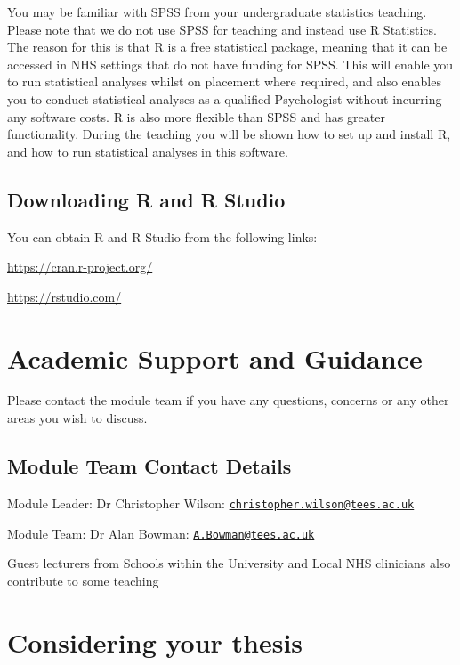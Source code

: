 \documentclass[
]{book}
\begin{document}
You may be familiar with SPSS from your undergraduate statistics teaching. Please note that we do not use SPSS for teaching and instead use R Statistics. The reason for this is that R is a free statistical package, meaning that it can be accessed in NHS settings that do not have funding for SPSS. This will enable you to run statistical analyses whilst on placement where required, and also enables you to conduct statistical analyses as a qualified Psychologist without incurring any software costs. R is also more flexible than SPSS and has greater functionality. During the teaching you will be shown how to set up and install R, and how to run statistical analyses in this software.

\hypertarget{downloading-r-and-r-studio}{%
\subsection{Downloading R and R Studio}\label{downloading-r-and-r-studio}}

You can obtain R and R Studio from the following links:

\url{https://cran.r-project.org/}

\url{https://rstudio.com/}

\hypertarget{academic-support-and-guidance}{%
\section{Academic Support and Guidance}\label{academic-support-and-guidance}}

Please contact the module team if you have any questions, concerns or any other areas you wish to discuss.

\hypertarget{module-team-contact-details}{%
\subsection{Module Team Contact Details}\label{module-team-contact-details}}

Module Leader: Dr Christopher Wilson: \href{mailto:christopher.wilson@tees.ac.uk}{\nolinkurl{christopher.wilson@tees.ac.uk}}

Module Team: Dr Alan Bowman: \href{mailto:A.Bowman@tees.ac.uk}{\nolinkurl{A.Bowman@tees.ac.uk}}

Guest lecturers from Schools within the University and Local NHS clinicians also contribute to some teaching

\hypertarget{considering-your-thesis}{%
\section{Considering your thesis}\label{considering-your-thesis}}
\end{document}
